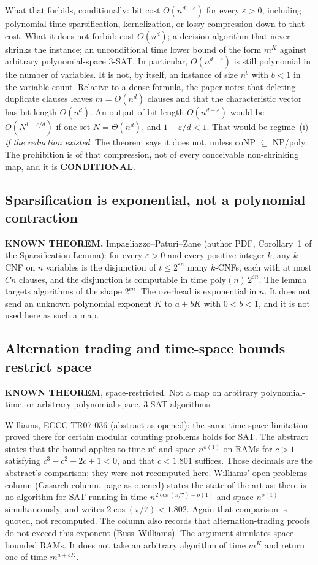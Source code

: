 \documentclass[11pt]{article}
\begin{document}
What that forbids, conditionally: bit cost $O(n^{d-\varepsilon})$ for every $\varepsilon>0$, including polynomial-time sparsification, kernelization, or lossy compression down to that cost. What it does not forbid: cost $O(n^{d})$; a decision algorithm that never shrinks the instance; an unconditional time lower bound of the form $m^{K}$ against arbitrary polynomial-space 3-SAT. In particular, $O(n^{d-\varepsilon})$ is still polynomial in the number of variables. It is not, by itself, an instance of size $n^{b}$ with $b<1$ in the variable count. Relative to a dense formula, the paper notes that deleting duplicate clauses leaves $m=O(n^{d})$ clauses and that the characteristic vector has bit length $O(n^{d})$. An output of bit length $O(n^{d-\varepsilon})$ would be $O(N^{1-\varepsilon/d})$ if one set $N=\Theta(n^{d})$, and $1-\varepsilon/d<1$. That would be regime~(i) \emph{if the reduction existed}. The theorem says it does not, unless coNP $\subseteq$ NP/poly. The prohibition is of that compression, not of every conceivable non-shrinking map, and it is \textbf{CONDITIONAL}.

\subsection*{Sparsification is exponential, not a polynomial contraction}
\textbf{KNOWN THEOREM.} Impagliazzo--Paturi--Zane (author PDF, Corollary~1 of the Sparsification Lemma): for every $\varepsilon>0$ and every positive integer $k$, any $k$-CNF on $n$ variables is the disjunction of $t\le 2^{\varepsilon n}$ many $k$-CNFs, each with at most $C n$ clauses, and the disjunction is computable in time $\mathrm{poly}(n)\,2^{\varepsilon n}$. The lemma targets algorithms of the shape $2^{c n}$. The overhead is exponential in $n$. It does not send an unknown polynomial exponent $K$ to $a+bK$ with $0<b<1$, and it is not used here as such a map.

\subsection*{Alternation trading and time-space bounds restrict space}
\textbf{KNOWN THEOREM}, space-restricted. Not a map on arbitrary polynomial-time, or arbitrary polynomial-space, 3-SAT algorithms.

Williams, ECCC TR07-036 (abstract as opened): the same time-space limitation proved there for certain modular counting problems holds for SAT. The abstract states that the bound applies to time $n^{c}$ and space $n^{o(1)}$ on RAMs for $c>1$ satisfying $c^{3}-c^{2}-2c+1<0$, and that $c<1.801$ suffices. Those decimals are the abstract's comparison; they were not recomputed here. Williams' open-problems column (Gasarch column, page as opened) states the state of the art as: there is no algorithm for SAT running in time $n^{2\cos(\pi/7)-o(1)}$ and space $n^{o(1)}$ simultaneously, and writes $2\cos(\pi/7)<1.802$. Again that comparison is quoted, not recomputed. The column also records that alternation-trading proofs do not exceed this exponent (Buss--Williams). The argument simulates space-bounded RAMs. It does not take an arbitrary algorithm of time $m^{K}$ and return one of time $m^{a+bK}$.
\end{document}
